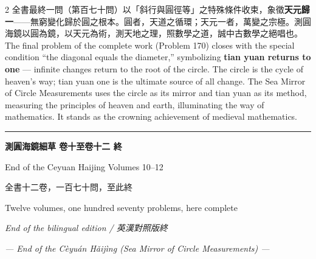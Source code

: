 \documentclass[11pt,a4paper]{article}
\newcommand{\longline}{\noindent\rule{\textwidth}{0.4pt}}
\begin{document}
\vspace{0.2cm}

\begin{paracol}{2}
全書最終一問（第百七十問）以「斜行與圓徑等」之特殊條件收束，象徵\textbf{天元歸一}——無窮變化歸於圓之根本。圓者，天道之循環；天元一者，萬變之宗極。測圓海鏡以圓為鏡，以天元為術，測天地之理，照數學之道，誠中古數學之絕唱也。
\switchcolumn
The final problem of the complete work (Problem 170) closes with the special condition ``the diagonal equals the diameter,'' symbolizing \textbf{tian yuan returns to one} --- infinite changes return to the root of the circle. The circle is the cycle of heaven's way; tian yuan one is the ultimate source of all change. The Sea Mirror of Circle Measurements uses the circle as its mirror and tian yuan as its method, measuring the principles of heaven and earth, illuminating the way of mathematics. It stands as the crowning achievement of medieval mathematics.
\end{paracol}

\vspace{1cm}
\begin{center}
\longline

\vspace{0.5cm}
{\Large\bfseries 測圓海鏡細草 卷十至卷十二 終}

\vspace{0.3cm}
{\normalsize End of the Ceyuan Haijing Volumes 10--12}

\vspace{0.5cm}
{\small\color{notecolor} 全書十二卷，一百七十問，至此終}

\vspace{0.2cm}
{\small\color{notecolor} Twelve volumes, one hundred seventy problems, here complete}

\vspace{0.5cm}
{\small\textit{End of the bilingual edition / 英漢對照版終}}
\end{center}

\vfill
\begin{center}
\textit{--- End of the C\`{e}yu\'{a}n H\v{a}ij\`{i}ng (Sea Mirror of Circle Measurements) ---}
\end{center}
\end{document}
